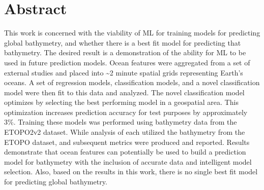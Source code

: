 \section{Abstract}
\setlength{\parindent}{10ex}
This work is concerned with the viability of \ac{ML} for training models  for predicting global bathymetry, and whether there is a best fit model for predicting that bathymetry.
The desired result is a demonstration of the ability for \ac{ML} to be used in future prediction models.
Ocean features were aggregated from a set of external studies and placed into \~{}2 minute spatial grids representing Earth's oceans.
A set of regression models, classification models, and a novel classification model were then fit to this data and analyzed.
The novel classification model optimizes by selecting the best performing model in a geospatial area.
This optimization increases prediction accuracy for test purposes by approximately 3\%.
Training these models was performed using bathymetry data from the ETOPO2v2 dataset.
While analysis of each utilized the bathymetry from the ETOPO dataset, and subsequent metrics were produced and reported.
Results demonstrate that ocean features can potentially be used to build a prediction model for bathymetry with the inclusion of accurate data and intelligent model selection.
Also, based on the results in this work, there is no single best fit model for predicting global bathymetry.
